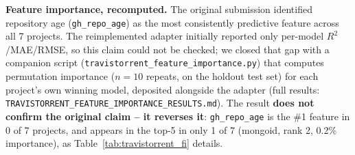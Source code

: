 \documentclass[technologies,article,submit,pdftex,moreauthors]{Definitions/mdpi}
\begin{document}
\textbf{Feature importance, recomputed.} The original submission
identified repository age (\texttt{gh\_repo\_age}) as the most
consistently predictive feature across all 7 projects. The
reimplemented adapter initially reported only per-model
\(R^2\)/MAE/RMSE, so this claim could not be checked; we closed that gap
with a companion script (\texttt{travistorrent\_\allowbreak feature\_\allowbreak importance.py})
that computes permutation importance (\(n=10\) repeats, on the holdout
test set) for each project's own winning model, deposited alongside the
adapter (full results:
\texttt{TRAVISTORRENT\_\allowbreak FEATURE\_\allowbreak IMPORTANCE\_\allowbreak RESULTS.md}). The result
\textbf{does not confirm the original claim -- it reverses it}:
\texttt{gh\_repo\_age} is the \#1 feature in 0 of 7 projects, and
appears in the top-5 in only 1 of 7 (mongoid, rank 2, 0.2\% importance), as Table~\ref{tab:travistorrent_fi} details.
\end{document}
